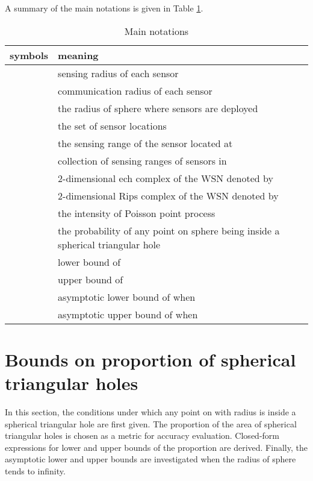 \documentclass[journal, twoside]{IEEEtran}
\begin{document}
A summary of the main notations is given in Table \ref{tabnot}.

\begin{table}[ht]
\caption{Main notations}
\label{tabnot}
\centering
\begin{tabular}{|c|p{6cm}|}
\hline
\bfseries symbols & \bfseries meaning\\
\hline
 & sensing radius of each sensor\\ \hline
 & communication radius of each sensor \\ \hline
 & the radius of sphere where sensors are deployed\\\hline
 & the set of sensor locations \\ \hline
 & the sensing range of the sensor located at  \\ \hline
 & collection of sensing ranges of sensors in  \\ \hline
 & 2-dimensional  ech complex of the WSN denoted by  \\ \hline
 & 2-dimensional Rips complex of the WSN denoted by  \\ \hline
 & the intensity of Poisson point process \\ \hline
 & the probability of any point on sphere being inside a spherical triangular hole \\\hline
 & lower bound of  \\ \hline
 & upper bound of  \\ \hline
 & asymptotic lower bound of  when \\ \hline
 & asymptotic upper bound of  when  \\ \hline
\end{tabular}
\end{table}

\section{Bounds on proportion of spherical triangular holes} \label{secbound}

In this section, the conditions under which any point on  with radius 
is inside a spherical triangular hole are first given. The proportion of the area of spherical
triangular holes is chosen as a metric for accuracy evaluation. Closed-form
expressions for lower and upper bounds of the proportion are derived. 
Finally, the asymptotic lower and upper bounds are investigated when the 
radius of sphere tends to infinity.
\end{document}
